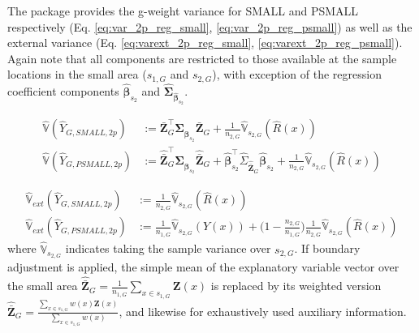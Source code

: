 \documentclass[article]{jss}
\newcommand{\var}{\mathbb{V}}
\begin{document}
The package provides the g-weight variance for SMALL and PSMALL respectively (Eq. \ref{eq:var_2p_reg_small}, \ref{eq:var_2p_reg_psmall}) as well as the  external variance (Eq. \ref{eq:varext_2p_reg_small}, \ref{eq:varext_2p_reg_psmall}). Again note that all components are restricted to those available at the sample locations in the small area ($s_{1,G}$ and $s_{2,G}$), with exception of the regression coefficient components $\hat{\pmb{\beta}}_{s_2}$ and $\hat{\pmb{\Sigma}}_{\hat{\pmb{\beta}}_{s_2}}$.


\begin{subequations}\label{eq:var_2p_small_psmall}
\begin{align}
  \hat{\var}(\hat{Y}_{G,SMALL,2p}) & := \bar{\pmb{Z}}_G^{\top}\hat{\pmb{\Sigma}}_{\hat{\pmb{\beta}}_{s_2}}\bar{\pmb{Z}}_G
    + \frac{1}{n_{2,G}}\hat{\var}_{s_{2,G}}(\hat{R}(x))  \label{eq:var_2p_reg_small} \\
  \hat{\var}(\hat{Y}_{G,PSMALL,2p}) & := \hat{\bar{\pmb{Z}}}_G^{\top}\hat{\pmb{\Sigma}}_{\hat{\pmb{\beta}}_{s_2}}\hat{\bar{\pmb{Z}}}_G
  + \hat{\pmb{\beta}}_{s_2}^{\top}\hat{\Sigma}_{\hat{\bar{\pmb{Z}}}_G}\hat{\pmb{\beta}}_{s_2}
  + \frac{1}{n_{2,G}}\hat{\var}_{s_{2,G}}(\hat{R}(x))  \label{eq:var_2p_reg_psmall}
\end{align}
\end{subequations}

\begin{subequations}\label{eq:varext_2p_small_psmall}
\begin{align}
  \hat{\var}_{ext}(\hat{Y}_{G,SMALL,2p}) & := \frac{1}{n_{2,G}}\hat{\var}_{s_{2,G}}(\hat{R}(x))  \label{eq:varext_2p_reg_small} \\
  \hat{\var}_{ext}(\hat{Y}_{G,PSMALL,2p}) & := \frac{1}{n_{1,G}}\hat{\var}_{s_{2,G}}(Y(x)) + \Big(1-\frac{n_{2,G}}{n_{1,G}}\Big)\frac{1}{n_{2,G}}\hat{\var}_{s_{2,G}}(\hat{R}(x)) \label{eq:varext_2p_reg_psmall}
\end{align}
\end{subequations}
where $\hat{\var}_{s_{2,G}}$ indicates taking the sample variance over $s_{2,G}$. If boundary adjustment is applied, the simple mean of the explanatory variable vector over the small area $\hat{\bar{\pmb{Z}}}_G=\frac{1}{n_{1,G}}\sum_{x \in s_{1,G}}\pmb{Z}(x)$ is replaced by its weighted version $\hat{\bar{\pmb{Z}}}_G=\frac{\sum_{x\in{s_{1,G}}}w(x)\pmb{Z}(x)}{\sum_{x\in{s_{1,G}}}w(x)}$, and likewise for exhaustively used auxiliary information.



\end{document}
